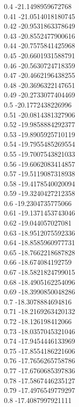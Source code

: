 {0.4	-21.1498959672768\\
0.41	-21.0514018180745\\
0.42	-20.9531863378649\\
0.43	-20.8552477900616\\
0.44	-20.7575841425968\\
0.45	-20.6601931588791\\
0.46	-20.5630724718359\\
0.47	-20.4662196438255\\
0.48	-20.3696322147651\\
0.49	-20.2733077404469\\
0.5	-20.1772438226996\\
0.51	-20.0814381327906\\
0.52	-19.9858884292377\\
0.53	-19.8905925710119\\
0.54	-19.7955485269554\\
0.55	-19.7007543821033\\
0.56	-19.6062083414857\\
0.57	-19.5119087318938\\
0.58	-19.4178540020094\\
0.59	-19.3240427212358\\
0.6	-19.2304735775066\\
0.61	-19.1371453743046\\
0.62	-19.044057027081\\
0.63	-18.9512075592336\\
0.64	-18.8585960977731\\
0.65	-18.7662218687828\\
0.66	-18.674084192759\\
0.67	-18.5821824799015\\
0.68	-18.4905162254096\\
0.69	-18.3990850048286\\
0.7	-18.3078884694816\\
0.71	-18.2169263420132\\
0.72	-18.126198412066\\
0.73	-18.0357045321046\\
0.74	-17.9454446133969\\
0.75	-17.8554186221606\\
0.76	-17.7656265758786\\
0.77	-17.6760685397836\\
0.78	-17.5867446235127\\
0.79	-17.4976549779297\\
0.8	-17.4087997921111\\
}
